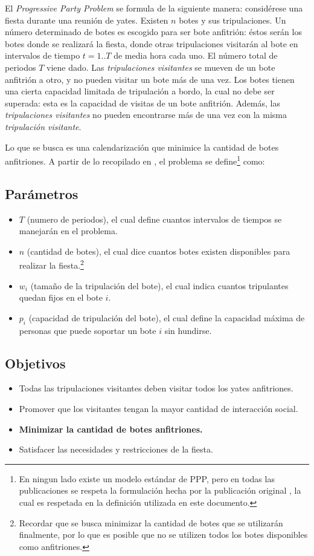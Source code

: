 \documentclass[letter, 10pt]{article}
\begin{document}
El \textit{Progressive Party Problem} se formula de la siguiente manera: considérese una fiesta durante una reunión de yates. Existen $n$ botes y sus tripulaciones. Un número  determinado de botes es escogido para ser bote anfitrión: éstos serán los botes donde se realizará la fiesta, donde otras tripulaciones visitarán al bote en intervalos de tiempo $t=1..T$ de media hora cada uno. El número total de periodos $T$ viene dado. Las \textit{tripulaciones visitantes} se mueven de un bote anfitrión a otro, y no pueden visitar un bote más de una vez. Los botes tienen una cierta capacidad limitada de tripulación a bordo, la cual no debe ser superada: esta es la capacidad de visitas de un bote anfitrión. Además, las \textit{tripulaciones visitantes} no pueden encontrarse más de una vez con la misma \textit{tripulación visitante}.

Lo que se busca es una calendarización que minimice la cantidad de botes anfitriones. A partir de lo recopilado en \cite{FirstPublication,PPPAsMIP,WalserThesis,LocalSearch}, el problema se define\footnote{En ningun lado existe un modelo estándar de PPP, pero en todas las publicaciones se respeta la formulación hecha por la publicación original \cite{FirstPublication}, la cual es respetada en la definición utilizada en este documento.} como: \\

\subsection{Parámetros}
\begin{itemize}
\item $T$ (numero de periodos), el cual define cuantos intervalos de tiempos se manejarán en el problema.
\item $n$ (cantidad de botes), el cual dice cuantos botes existen disponibles para realizar la fiesta.\footnote{Recordar que se busca minimizar la cantidad de botes que se utilizarán finalmente, por lo que es posible que no se utilizen todos los botes disponibles como anfitriones.}
\item $w_i$ (tamaño de la tripulación del bote), el cual indica cuantos tripulantes quedan fijos en el bote $i$.
\item $p_i$ (capacidad de tripulación del bote), el cual define la capacidad máxima de personas que puede soportar un bote $i$ sin hundirse.
\end{itemize}

\subsection{Objetivos}
\begin{itemize}
\item Todas las tripulaciones visitantes deben visitar todos los yates anfitriones.
\item Promover que los visitantes tengan la mayor cantidad de interacción social.
\item \textbf{Minimizar la cantidad de botes anfitriones.}
\item Satisfacer las necesidades y restricciones de la fiesta.
\end{itemize}
\end{document}
